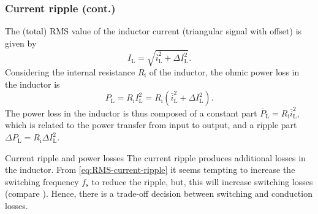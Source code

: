 \begin{frame}
    \frametitle{Current ripple (cont.)}
    The (total) RMS value of the inductor current (triangular signal with offset) is given by
    \begin{equation}
        I_\mathrm{L} = \sqrt{\overline{i}^2_\mathrm{L} + \Delta I^2_\mathrm{L}}.
    \end{equation}
    Considering the internal resistance $R_\mathrm{i}$ of the inductor, the ohmic power loss in the inductor is
    \begin{equation}
        P_\mathrm{L} = R_\mathrm{i} I^2_\mathrm{L} = R_\mathrm{i} \left(\overline{i}^2_\mathrm{L} + \Delta I^2_\mathrm{L}\right).
    \end{equation}
    The power loss in the inductor is thus composed of a constant part $\overline{P}_\mathrm{L} = R_\mathrm{i} \overline{i}^2_\mathrm{L}$, which is related to the power transfer from input to output, and a ripple part $\Delta P_\mathrm{L} = R_\mathrm{i} \Delta I^2_\mathrm{L}$.   
    \begin{varblock}{Current ripple and power losses}
        The current ripple produces additional losses in the inductor. From \eqref{eq:RMS-current-ripple} it seems tempting to increase the switching frequency $f_\mathrm{s}$ to reduce the ripple, but, this will increase switching losses (compare ). Hence, there is a trade-off decision between switching and conduction losses.
    \end{varblock}
\end{frame}

